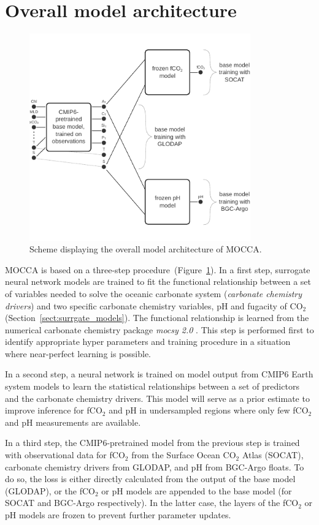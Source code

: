 \documentclass{article}
\begin{document}
	\section{Overall model architecture}
	\begin{figure}
		\includegraphics[width=0.85\textwidth]{./figures/model_architecture_scheme.pdf}
		\caption{Scheme displaying the overall model architecture of MOCCA.}
		\label{fig:fco2_model}
	\end{figure}
	MOCCA is based on a three-step procedure~(Figure~\ref{fig:fco2_model}). In a first step, surrogate neural network models are trained to fit the functional relationship between a set of variables needed to solve the oceanic carbonate system (\textit{carbonate chemistry drivers}) and two specific carbonate chemistry variables, pH and fugacity of CO$_2$ (Section~\ref{sect:surrgate_models}). The functional relationship is learned from the numerical carbonate chemistry package \textit{mocsy 2.0} \citep{orr2015}. This step is performed first to identify appropriate hyper parameters and training procedure in a situation where near-perfect learning is possible.
	
	In a second step, a neural network is trained on model output from CMIP6 Earth system models to learn the statistical relationships between a set of predictors and the carbonate chemistry drivers. This model will serve as a prior estimate to improve inference for fCO$_2$ and pH in undersampled regions where only few fCO$_2$ and pH measurements are available.
	
	In a third step, the CMIP6-pretrained model from the previous step is trained with observational data for fCO$_2$ from the Surface Ocean CO$_2$ Atlas (SOCAT), carbonate chemistry drivers from GLODAP, and pH from BGC-Argo floats. To do so, the loss is either directly calculated from the output of the base model (GLODAP), or the fCO$_2$ or pH models are appended to the base model (for SOCAT and BGC-Argo respectively). In the latter case, the layers of the fCO$_2$ or pH models are frozen to prevent further parameter updates.
	
\end{document}
